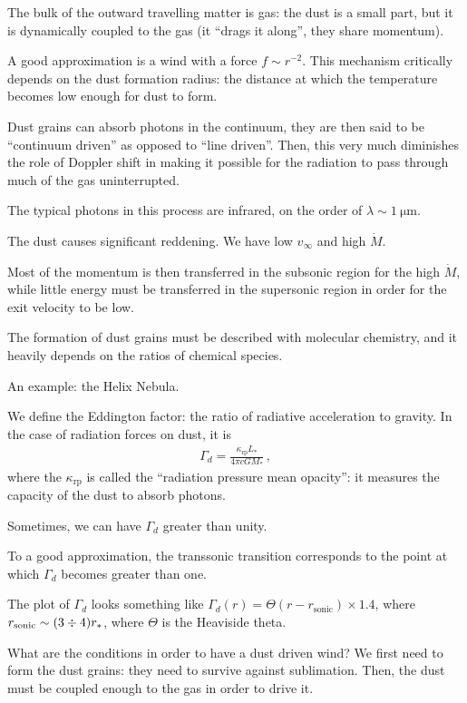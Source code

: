 \documentclass[main.tex]{subfiles}
\begin{document}
The bulk of the outward travelling matter is gas: the dust is a small part, but it is dynamically coupled to the gas (it ``drags it along'', they share momentum). 

A good approximation is a wind with a force \(f \sim r^{-2}\). 
This mechanism critically depends on the dust formation radius: the distance at which the temperature becomes low enough for dust to form. 

Dust grains can absorb photons in the continuum, they are then said to be ``continuum driven'' as opposed to ``line driven''. 
Then, this very much diminishes the role of Doppler shift in making it possible for the radiation to pass through much of the gas uninterrupted. 

The typical photons in this process are infrared, on the order of \(\lambda \sim \SI{1}{\micro\metre}\). 

The dust causes significant reddening. We have low \(v _{ \infty }\) and high \(\dot{M}\).

Most of the momentum is then transferred in the subsonic region for the high \(\dot{M}\), while little energy must be transferred in the supersonic region in order for the exit velocity to be low. 

The formation of dust grains must be described with molecular chemistry, and it heavily depends on the ratios of chemical species. 

An example: the Helix Nebula. 

We define the Eddington factor: the ratio of radiative acceleration to gravity. 
In the case of radiation forces on dust, it is 
%
\begin{align}
  \Gamma_{d} = \frac{\kappa _{\text{rp}}L_{*}}{4 \pi c G M_{*}}
\,,
\end{align}
%
where the \(\kappa _{\text{rp}} \) is called the ``radiation pressure mean opacity'': it measures the capacity of the dust to absorb photons. 

Sometimes, we can have \(\Gamma_{d}\) greater than unity.

To a good approximation, the transsonic transition corresponds to the point at which \(\Gamma_{d}\) becomes greater than one. 

The plot of \(\Gamma_{d}\) looks something like \(\Gamma_{d} (r) = \Theta (r - r _{\text{sonic}}) \times 1.4\), where \(r _{\text{sonic}} \sim (3 \divisionsymbol 4) r_{*}\), where \(\Theta \) is the Heaviside theta.

What are the conditions in order to have a dust driven wind? We first need to  form the dust grains: they need to survive against sublimation. 
Then, the dust must be coupled enough to the gas in order to drive it. 
\end{document}

